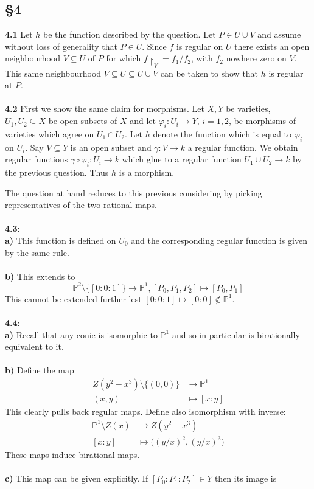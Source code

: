 \documentclass[12pt]{article}
\numberwithin{thm}{subsection}
\numberwithin{defn}{subsection}
\numberwithin{lemma}{subsection}
\numberwithin{example}{subsection}
\numberwithin{notation}{subsection}
\numberwithin{cor}{subsection}
\numberwithin{remark}{subsection}
\numberwithin{condition}{subsection}
\numberwithin{question}{subsection}
\numberwithin{construction}{subsection}
\numberwithin{construction}{subsection}
\numberwithin{construction}{subsection}
\newcommand{\bb}[1]{\mathbb{#1}}
\newcommand{\lto}{\longrightarrow}
\begin{document}
\subsection{\S 4}
\textbf{4.1} Let $h$ be the function described by the question. Let $P \in U \cup V$ and assume without loss of generality that $P \in U$. Since $f$ is regular on $U$ there exists an open neighbourhood $V \subseteq U$ of $P$ for which $f\restriction_{V} = f_1/f_2$, with $f_2$ nowhere zero on $V$. This same neighbourhood $V \subseteq U \subseteq U \cup V$ can be taken to show that $h$ is regular at $P$.\\\\
%
\textbf{4.2} First we show the same claim for morphisms. Let $X,Y$ be varieties, $U_1,U_2 \subseteq X$ be open subsets of $X$ and let $\varphi_i: U_i \lto Y$, $i = 1,2$, be morphisms of varieties which agree on $U_1 \cap U_2$. Let $h$ denote the function which is equal to $\varphi_i$ on $U_i$. Say $V \subseteq Y$ is an open subset and $\gamma: V \lto k$ a regular function. We obtain regular functions $\gamma \circ \varphi_i: U_i \lto k$ which glue to a regular function $U_1 \cup U_2 \lto k$ by the previous question. Thus $h$ is a morphism.

The question at hand reduces to this previous considering by picking representatives of the two rational maps.\\\\
%
\textbf{4.3}:\\
\textbf{a)} This function is defined on $U_0$ and the corresponding regular function is given by the same rule.\\\\
%
\textbf{b)} This extends to $$\bb{P}^2\setminus\lbrace [0:0:1]\rbrace \lto \bb{P}^1, [P_0,P_1,P_2] \longmapsto [P_0,P_1]$$
This cannot be extended further lest $[0:0:1] \mapsto [0:0] \not\in \bb{P}^1$.\\\\
%
\textbf{4.4}:\\
\textbf{a)} Recall that any conic is isomorphic to $\bb{P}^1$ and so in particular is birationally equivalent to it.\\\\
%
\textbf{b)} Define the map
\begin{align*}
    Z(y^2 - x^3)\setminus \lbrace (0,0) \rbrace &\lto \bb{P}^1\\
    (x,y) &\longmapsto [x:y]
\end{align*}
This clearly pulls back regular maps. Define also isomorphism with inverse:
\begin{align*}
    \bb{P}^1\setminus Z(x) &\lto Z(y^2 - x^3)\\
    [x:y] &\longmapsto \big((y/x)^2,(y/x)^3\big)
\end{align*}
These maps induce birational maps.\\\\
%
\textbf{c)} This map can be given explicitly. If $[P_0:P_1:P_2] \in Y$ then its image is \\\\
%
\end{document}
